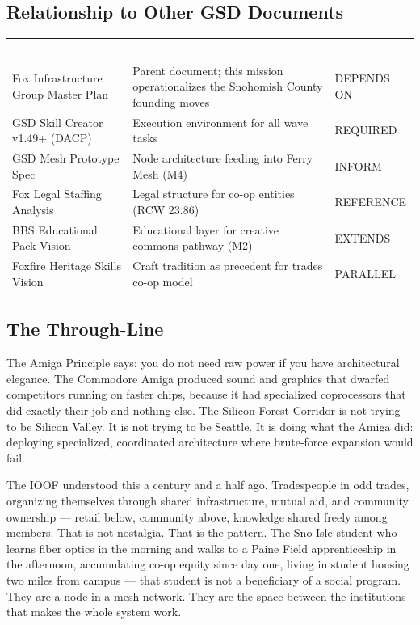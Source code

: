 \documentclass[11pt,letterpaper]{article}
\newcommand{\tableheader}[1]{\textbf{\sffamily\textcolor{white}{#1}}}
\begin{document}
\subsection{Relationship to Other GSD Documents}

\begin{center}
\begin{tabularx}{\textwidth}{L{4cm}XC{3cm}}
\toprule
{}
\tableheader{Document} & \tableheader{Relationship} & \tableheader{Priority} \\
\midrule
Fox Infrastructure Group Master Plan & Parent document; this mission operationalizes the Snohomish County founding moves & DEPENDS ON \\
GSD Skill Creator v1.49+ (DACP) & Execution environment for all wave tasks & REQUIRED \\
GSD Mesh Prototype Spec & Node architecture feeding into Ferry Mesh (M4) & INFORM \\
Fox Legal Staffing Analysis & Legal structure for co-op entities (RCW 23.86) & REFERENCE \\
BBS Educational Pack Vision & Educational layer for creative commons pathway (M2) & EXTENDS \\
Foxfire Heritage Skills Vision & Craft tradition as precedent for trades co-op model & PARALLEL \\
\bottomrule
\end{tabularx}
\end{center}

\subsection{The Through-Line}

The Amiga Principle says: you do not need raw power if you have architectural elegance. The Commodore Amiga produced sound and graphics that dwarfed competitors running on faster chips, because it had specialized coprocessors that did exactly their job and nothing else. The Silicon Forest Corridor is not trying to be Silicon Valley. It is not trying to be Seattle. It is doing what the Amiga did: deploying specialized, coordinated architecture where brute-force expansion would fail.

The IOOF understood this a century and a half ago. Tradespeople in odd trades, organizing themselves through shared infrastructure, mutual aid, and community ownership --- retail below, community above, knowledge shared freely among members. That is not nostalgia. That is the pattern. The Sno-Isle student who learns fiber optics in the morning and walks to a Paine Field apprenticeship in the afternoon, accumulating co-op equity since day one, living in student housing two miles from campus --- that student is not a beneficiary of a social program. They are a node in a mesh network. They are the space between the institutions that makes the whole system work.
\end{document}
